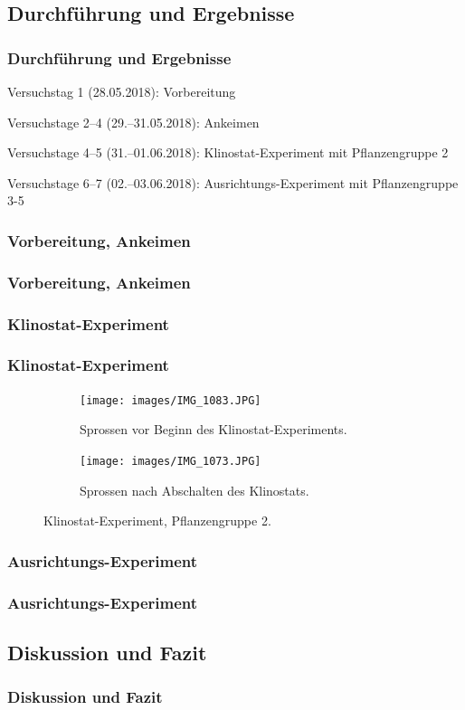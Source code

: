 \documentclass[aspectratio=169]{beamer}
\begin{document}
	\subsection{Durchführung und Ergebnisse}
	
	\begin{frame}
		\frametitle{Durchführung und Ergebnisse}
		
		Versuchstag 1 (28.05.2018): Vorbereitung
		
		Versuchstage 2–4 (29.–31.05.2018): Ankeimen
		
		Versuchstage 4–5 (31.–01.06.2018): Klinostat-Experiment mit Pflanzengruppe 2
		
		Versuchstage 6–7 (02.–03.06.2018): Ausrichtungs-Experiment mit Pflanzengruppe 3-5
	\end{frame}
	
	\subsubsection{Vorbereitung, Ankeimen}
	
	\begin{frame}
		\frametitle{Vorbereitung, Ankeimen}
	\end{frame}
	
	\subsubsection{Klinostat-Experiment}
	
	\begin{frame}
		\frametitle{Klinostat-Experiment}
		
			\begin{figure}[H]
			
			\centering
			\begin{subfigure}[b]{0.44\textwidth}
				\texttt{[image: images/IMG\_1083.JPG]}
				\caption{Sprossen vor Beginn des Klinostat-Experiments.\label{Foto 1}}	
			\end{subfigure}
			
			\begin{subfigure}[b]{0.44\textwidth}
				\texttt{[image: images/IMG\_1073.JPG]}
				\caption{Sprossen nach Abschalten des Klinostats.\label{Foto 2}}
			\end{subfigure}
			\caption{Klinostat-Experiment, Pflanzengruppe 2.\label{Foto 2}}
			
		\end{figure}
		
	
		
	\end{frame}
	
	\subsubsection{Ausrichtungs-Experiment}
	
	\begin{frame}
		\frametitle{Ausrichtungs-Experiment}
	
	\end{frame}
	
	\subsection{Diskussion und Fazit}
	
	\begin{frame}
		\frametitle{Diskussion und Fazit}
\end{frame}	
	
\end{document}
